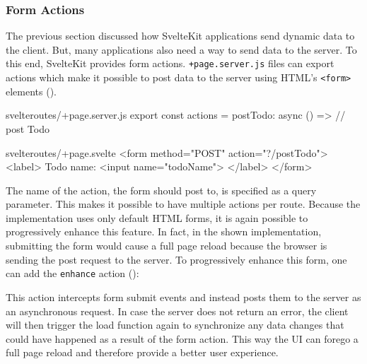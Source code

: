 \subsubsection{Form Actions}
\label{sec:sveltekit-form-actions}

The previous section discussed how SvelteKit applications send dynamic data to the client. But, many applications also need a way to send data to the server. To this end, SvelteKit provides form actions. \texttt{+page.server.js} files can export actions which make it possible to post data to the server using HTML's \texttt{<form>} elements ().

\begin{listing}[h!]
\begin{myminted}{svelte}{routes/+page.server.js}
export const actions = {
  postTodo: async () => {
    // post Todo
  }
}
\end{myminted}
\begin{myminted}{svelte}{routes/+page.svelte}
<form method="POST" action="?/postTodo">
  <label>
    Todo name:
    <input name="todoName">
  </label>
</form>
\end{myminted}
\caption{Example server action to post a new to-do.}
\label{fig:sveltekit-server-action}
\end{listing}

The name of the action, the form should post to, is specified as a query parameter. This makes it possible to have multiple actions per route. Because the implementation uses only default HTML forms, it is again possible to progressively enhance this feature. In fact, in the shown implementation, submitting the form would cause a full page reload because the browser is sending the post request to the server. To progressively enhance this form, one can add the \texttt{enhance} action ():

\begin{listing}[h!]
\s{$}
\caption{Progressively enhanced form that will handle submits without a full page reload.}
\label{fig:sveltekit-form-action-enhance}
\end{listing}

This action intercepts form submit events and instead posts them to the server as an asynchronous request. In case the server does not return an error, the client will then trigger the load function again to synchronize any data changes that could have happened as a result of the form action. This way the UI can forego a full page reload and therefore provide a better user experience.

